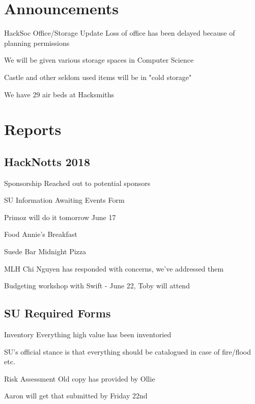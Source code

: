 \documentclass[11pt,hacksoc]{meetingmins}
\begin{document}
\maketitle

\section{Announcements}
\begin{items}
\item
HackSoc Office/Storage Update
	\subitem
	Loss of office has been delayed because of planning permissions
	
	\subitem
	We will be given various storage spaces in Computer Science
	
	\subitem
	Castle and other seldom used items will be in "cold storage"
	
	\subitem
	We have 29 air beds at Hacksmiths

\end{items}

\section{Reports}

\subsection{HackNotts 2018}
\begin{hiddensubitems}
	\item
	Sponsorship
		\subitem
		Reached out to potential sponsors
	
	\item
	SU Information
		\subitem
		Awaiting Events Form
		
		\subitem
		Primoz will do it tomorrow June 17
	
	\item
	Food
		\subitem
		Annie's Breakfast
		
		\subitem
		Suede Bar Midnight Pizza
	
	\item
	MLH
		\subitem
		Chi Nguyen has responded with concerns, we've addressed them
		
		\subitem
		Budgeting workshop with Swift - June 22, Toby will attend
\end{hiddensubitems}


\subsection{SU Required Forms}
\begin{hiddensubitems}
	\item
	Inventory
		\subitem
		Everything high value has been inventoried
		
		\subitem
		SU's official stance is that everything should be catalogued in case of fire/flood etc.
	
	\item
	Risk Assessment
		\subitem
		Old copy has provided by Ollie
		
		\subitem
		Aaron will get that submitted by Friday 22nd
	
\end{hiddensubitems}
\end{document}
